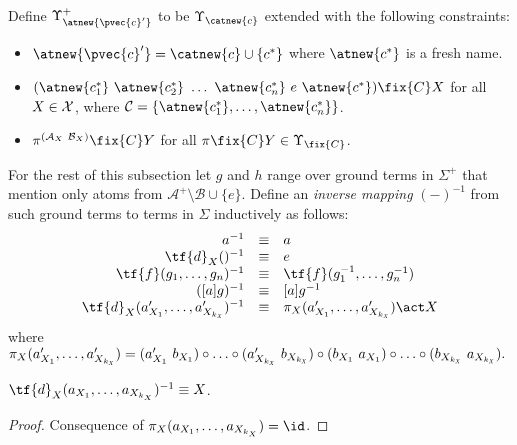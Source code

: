 \begin{definition}
    Define $\Upsilon^+_{\atnew{\pvec{c}'}}$ to be $\Upsilon_{\catnew{c}}$ extended with the following constraints:
    \begin{itemize}
        \item $\atnew{\pvec{c}'} = \catnew{c}\cup\{c^*\}$ where $\atnew{c^*}$ is a fresh name.

        \item $(\atnew{c_1^*} \ \atnew{c_2^*} \ \ldots \ \atnew{c_n^*} \ e \ \atnew{c^*})\fix{C} X$ for all $X\in{\cal X}$, where ${\cal C} = \{\atnew{c_1^*},\ldots,\atnew{c_n^*}\}$.

        \item $\pi^{({\cal A}_X \ {\cal B}_X)}\fix{C} Y$ for all $\pi\fix{C} Y\in \Upsilon_{\fix{C}}$.
    \end{itemize}
\end{definition}

\begin{definition}
    For the rest of this subsection let $g$ and $h$ range over ground terms in $\Sigma^+$ that mention only atoms from $\mathcal{A}^+\setminus\mathcal{B}\cup\{e\}$. Define an \emph{inverse mapping} $(-)^{-1}$ from such ground terms to terms in $\Sigma$ inductively as follows:
    $$
    \begin{array}{rcl}
    a^{-1}&\equiv& a \\
    \tf{d}_X()^{-1} &\equiv & e\\
    \tf{f}(g_1,\ldots,g_n)^{-1}&\equiv &\tf{f}(g_1^{-1},\ldots,g_n^{-1}) \\
    ([a]g)^{-1}&\equiv& [a]g^{-1}\\
    \tf{d}_X(a_{X_1}', \ldots, a_{X_{k_{\scalebox{.4}{$X$}}}}')^{-1} &\equiv& \pi_X(a_{X_1}', \ldots, a_{X_{k_{\scalebox{.4}{$X$}}}}')\act X
    \end{array}
    $$
    where $\pi_X(a_{X_1}', \ldots, a_{X_{k_{\scalebox{.4}{$X$}}}}') = (a_{X_1}' \ b_{X_1})\circ \ldots\circ (a_{X_{k_{\scalebox{.4}{$X$}}}}' \ b_{X_{k_{\scalebox{.4}{$X$}}}})\circ (b_{X_1} \ a_{X_1})\circ \ldots\circ (b_{X_{k_{\scalebox{.4}{$X$}}}} \ a_{X_{k_{\scalebox{.4}{$X$}}}}).$
\end{definition}

\begin{lemma}\label{alemma:d-X}
    $\tf{d}_{X}(a_{X_1}, \ldots, a_{X_{k_X}})^{-1} \equiv X$.
\end{lemma}

\begin{proof}
    Consequence of $\pi_X(a_{X_1}, \ldots, a_{X_{k_X}}) = \id$.
\end{proof}

